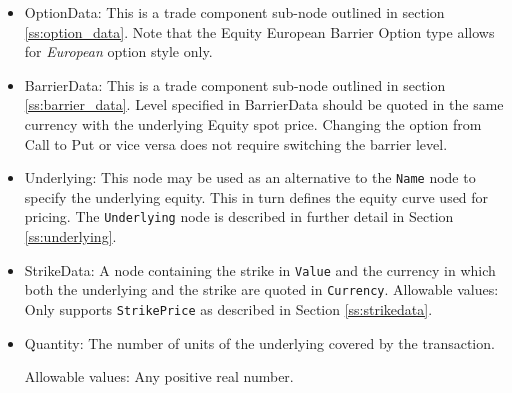 \begin{itemize}
\item OptionData: This is a trade component sub-node outlined in section \ref{ss:option_data}. Note that the Equity European Barrier Option type allows for \emph{European} option style only. 

\item BarrierData: This is a trade component sub-node outlined in section \ref{ss:barrier_data}.
Level specified in BarrierData should be quoted in the same currency with the underlying Equity spot price.
Changing the option from Call to Put or vice versa does not require switching the barrier level.

\item Underlying:  This node may be used as an alternative to the \lstinline!Name! node to specify the underlying equity. This in turn defines the equity curve used for pricing. The \lstinline!Underlying! node is described in further detail in Section \ref{ss:underlying}.

\item StrikeData: A node containing the strike in \lstinline!Value! and the currency in which both the underlying and the strike are quoted in \lstinline!Currency!.
Allowable values: Only supports \lstinline!StrikePrice! as described in Section \ref{ss:strikedata}.
    
\item Quantity: The number of units of the underlying covered by the transaction.
    
Allowable values:  Any positive real number.
    
\end{itemize}
